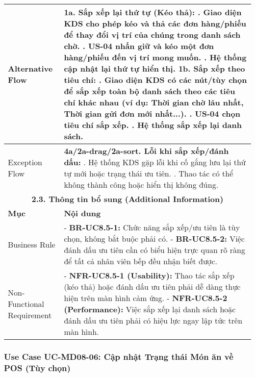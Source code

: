 \begin{longtable}{|m{4cm}|p{11cm}|}
\hline
Alternative Flow & \textbf{1a. Sắp xếp lại thứ tự (Kéo thả):} \newline    1. Giao diện KDS cho phép kéo và thả các đơn hàng/phiếu để thay đổi vị trí của chúng trong danh sách chờ. \newline    2. US-04 nhấn giữ và kéo một đơn hàng/phiếu đến vị trí mong muốn. \newline    3. Hệ thống cập nhật lại thứ tự hiển thị. \newline \textbf{1b. Sắp xếp theo tiêu chí:} \newline    1. Giao diện KDS có các nút/tùy chọn để sắp xếp toàn bộ danh sách theo các tiêu chí khác nhau (ví dụ: Thời gian chờ lâu nhất, Thời gian gửi đơn mới nhất...). \newline    2. US-04 chọn tiêu chí sắp xếp. \newline    3. Hệ thống sắp xếp lại danh sách. \\
\hline
Exception Flow & \textbf{4a/2a-drag/2a-sort. Lỗi khi sắp xếp/đánh dấu:} \newline    1. Hệ thống KDS gặp lỗi khi cố gắng lưu lại thứ tự mới hoặc trạng thái ưu tiên. \newline    2. Thao tác có thể không thành công hoặc hiển thị không đúng. \\
\hline
\multicolumn{2}{|c|}{\textbf{2.3. Thông tin bổ sung (Additional Information)}} \\
\hline
\textbf{Mục} & \textbf{Nội dung} \\
\hline
Business Rule & - \textbf{BR-UC8.5-1:} Chức năng sắp xếp/ưu tiên là tùy chọn, không bắt buộc phải có. \newline - \textbf{BR-UC8.5-2:} Việc đánh dấu ưu tiên cần có biểu hiện trực quan rõ ràng để tất cả nhân viên bếp đều nhận biết được. \\
\hline
Non-Functional Requirement & - \textbf{NFR-UC8.5-1 (Usability):} Thao tác sắp xếp (kéo thả) hoặc đánh dấu ưu tiên phải dễ dàng thực hiện trên màn hình cảm ứng. \newline - \textbf{NFR-UC8.5-2 (Performance):} Việc sắp xếp lại danh sách hoặc đánh dấu ưu tiên phải có hiệu lực ngay lập tức trên màn hình. \\
\hline
\end{longtable}

\subsubsection{Use Case UC-MD08-06: Cập nhật Trạng thái Món ăn về POS (Tùy chọn)}


